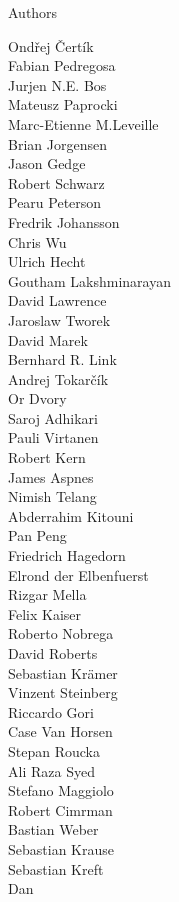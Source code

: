 \begin{frame}{Authors}
\begin{multicols}{5}
\tiny
Ondřej Čertík\\
Fabian Pedregosa\\
Jurjen N.E. Bos\\
Mateusz Paprocki\\
Marc-Etienne M.Leveille\\
Brian Jorgensen\\
Jason Gedge\\
Robert Schwarz\\
Pearu Peterson\\
Fredrik Johansson\\
Chris Wu\\
Ulrich Hecht\\
Goutham Lakshminarayan\\
David Lawrence\\
Jaroslaw Tworek\\
David Marek\\
Bernhard R. Link\\
Andrej Tokarčík\\
Or Dvory\\
Saroj Adhikari\\
Pauli Virtanen\\
Robert Kern\\
James Aspnes\\
Nimish Telang\\
Abderrahim Kitouni\\
Pan Peng\\
Friedrich Hagedorn\\
Elrond der Elbenfuerst\\
Rizgar Mella\\
Felix Kaiser\\
Roberto Nobrega\\
David Roberts\\
Sebastian Krämer\\
Vinzent Steinberg\\
Riccardo Gori\\
Case Van Horsen\\
Stepan Roucka\\
Ali Raza Syed\\
Stefano Maggiolo\\
Robert Cimrman\\
Bastian Weber\\
Sebastian Krause\\
Sebastian Kreft\\
Dan\\

\end{multicols}
\end{frame}
